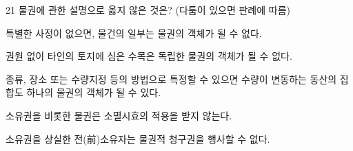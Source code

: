 \begin{question}{21}
물권에 관한 설명으로 옳지 않은 것은? (다툼이 있으면 판례에 따름)
\begin{choices}
  \item 특별한 사정이 없으면, 물건의 일부는 물권의 객체가 될 수 없다.
  \item 권원 없이 타인의 토지에 심은 수목은 독립한 물권의 객체가 될 수 없다.
  \item 종류, 장소 또는 수량지정 등의 방법으로 특정할 수 있으면 수량이 변동하는 동산의 집합도 하나의 물권의 객체가 될 수 있다.
  \item 소유권을 비롯한 물권은 소멸시효의 적용을 받지 않는다.
  \item 소유권을 상실한 전(前)소유자는 물권적 청구권을 행사할 수 없다.
\end{choices}
\end{question}
